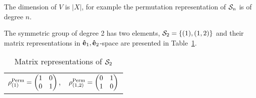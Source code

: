 	
	The dimension of $V$ is $|X|$, for example the permutation representation of $\mathcal{S}_n$ is of degree $n$.
	
	\begin{example}
		The symmetric group of degree 2 has two elements, $\mathcal{S}_2 = \{(1), (1,2)\}$ and their matrix representations in $\mathbf{\hat{e}}_1,\mathbf{\hat{e}}_2$-space are presented in Table~\ref{table:permS2}.
		\begin{table}[hbt!]
			\centering
			\begin{tabular}{c c}
				$\rho_{(1)}^{\text{Perm}} =
				\begin{pmatrix}
					1 & 0 \\ 0 & 1
				\end{pmatrix}$, &
				$\rho_{(1,2)}^{\text{Perm}} =
				\begin{pmatrix}
					0 & 1 \\ 1 & 0
				\end{pmatrix}$
			\end{tabular}
			\caption{Matrix representations of $\mathcal{S}_2$}
			\label{table:permS2}
		\end{table}
	\end{example}
